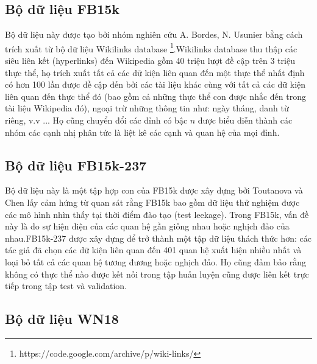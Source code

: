 \subsection{Bộ dữ liệu FB15k}

Bộ dữ liệu này được tạo bởi nhóm nghiên cứu A. Bordes, N. Usunier \cite{bordes2013translating} bằng cách trích xuất từ bộ dữ liệu Wikilinks database \footnote{https://code.google.com/archive/p/wiki-links/}.Wikilinks database thu thập các siêu liên kết (hyperlinks) đến Wikipedia gồm 40 triệu lượt đề cập trên 3 triệu thực thể, họ trích xuất tất cả các dữ kiện liên quan đến một thực thể nhất định có hơn 100 lần được đề cập đến bởi các tài liệu khác cùng với tất cả các dữ kiện liên quan đến thực thể đó (bao gồm cả những thực thể con được nhắc đến trong tài liệu Wikipedia đó), ngoại trừ những thông tin như: ngày tháng, danh từ riêng, v.v ... Họ cũng chuyển đổi các đỉnh có bậc \(n\) được biểu diễn thành các nhóm các cạnh nhị phân tức là liệt kê các cạnh và quan hệ của mọi đỉnh. 


\subsection{Bộ dữ liệu FB15k-237}

Bộ dữ liệu này là một tập hợp con của FB15k được xây dựng bởi Toutanova và Chen \cite{toutanova2015observed} lấy cảm hứng từ quan sát rằng FB15k bao gồm dữ liệu thử nghiệm được các mô hình nhìn thấy tại thời điểm đào tạo (test leekage). Trong FB15k, vấn đề này là do sự hiện diện của các quan hệ gần giống nhau hoặc nghịch đảo của nhau.FB15k-237 được xây dựng để trở thành một tập dữ liệu thách thức hơn: các tác giả đã chọn các dữ kiện liên quan đến 401 quan hệ xuất hiện nhiều nhất và loại bỏ tất cả các quan hệ tương đương hoặc nghịch đảo. Họ cũng đảm bảo rằng không có thực thể nào được kết nối trong tập huấn luyện cũng được liên kết trực tiếp trong tập test và validation.


\subsection{Bộ dữ liệu WN18}

